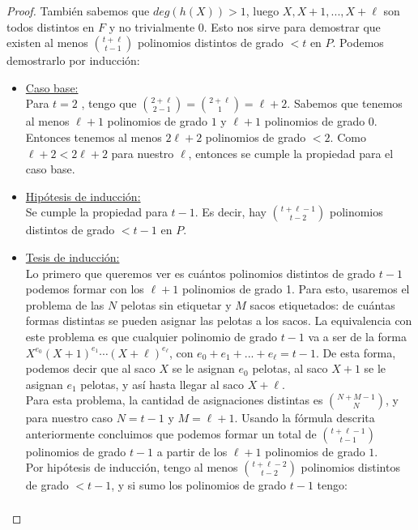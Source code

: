 \begin{proof}
		También sabemos que $deg(h(X))>1$, luego $X,X+1,...,X+\ell $ son todos distintos en $F$ y no trivialmente $0$. Esto nos sirve para demostrar que existen al menos ${t+\ell }\choose{t-1}$ polinomios distintos de grado $<t$ en $P$. Podemos demostrarlo por inducción:
		\begin{itemize}
			\item \underline{Caso base:}\\
			Para $t=2$ , tengo que ${{2+\ell }\choose{2-1}}={{2+\ell }\choose{1}}=\ell +2$. Sabemos que tenemos al menos $\ell +1$ polinomios de grado $1$ y $\ell +1$ polinomios de grado 0. Entonces tenemos al menos $2\ell +2$ polinomios de grado $<2$. Como $\ell +2< 2\ell +2$ para nuestro $\ell $, entonces se cumple la propiedad para el caso base.
			\item \underline{Hipótesis de inducción:}\\
			Se cumple la propiedad para $t-1$. Es decir, hay ${{t+\ell -1}\choose{t-2}}$ polinomios distintos de grado $<t-1$ en $P$.
			\item \underline{Tesis de inducción:}\\
			Lo primero que queremos ver es cuántos polinomios distintos de grado $t-1$ podemos formar con los $\ell +1$ polinomios de grado 1. Para esto, usaremos el problema de las $N$ pelotas sin etiquetar y $M$ sacos etiquetados: de cuántas formas distintas se pueden asignar las pelotas a los sacos. La equivalencia con este problema es que cualquier polinomio de grado $t-1$ va a ser de la forma $X^{e_0}(X+1)^{e_1}\cdots(X+\ell )^{e_\ell }$, con $e_0+e_1+...+e_\ell =t-1$. De esta forma, podemos decir que al saco $X$ se le asignan $e_0$ pelotas, al saco $X+1$ se le asignan $e_1$ pelotas, y así­ hasta llegar al saco $X+\ell $.\\
			Para esta problema, la cantidad de asignaciones distintas es ${{N+M-1}\choose{N}}$, y para nuestro caso $N=t-1$ y $M=\ell +1$. Usando la fórmula descrita anteriormente concluimos que podemos formar un total de ${{t+\ell -1}\choose{t-1}}$ polinomios de grado $t-1$ a partir de los $\ell +1$ polinomios de grado $1$.\\
			Por hipótesis de inducción, tengo al menos ${{t+\ell -2}\choose{t-2}}$ polinomios distintos de grado $<t-1$, y si sumo los polinomios de grado $t-1$ tengo:
			\begin{eqnarray}

\end{eqnarray}
\end{itemize}
\end{proof}
